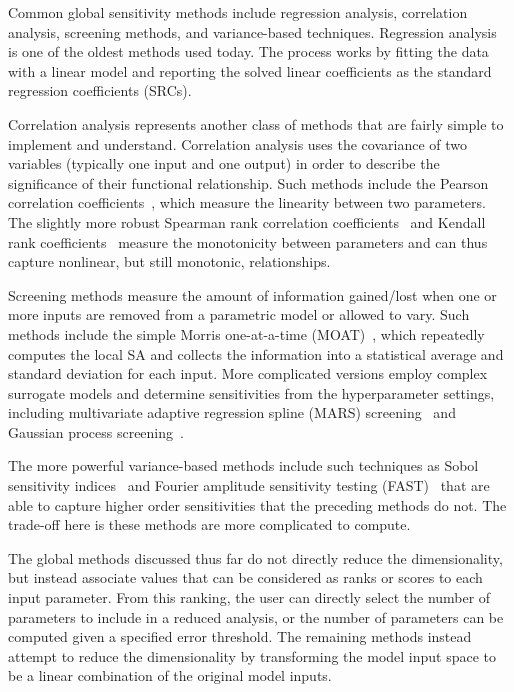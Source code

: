 Common global sensitivity methods include regression analysis, correlation analysis, screening methods, and variance-based techniques.
%
Regression analysis~\cite{Galton1886} is one of the oldest methods used today.
%
The process works by fitting the data with a linear model and reporting the solved linear coefficients as the standard regression coefficients (SRCs).

Correlation analysis represents another class of methods that are fairly simple to implement and understand.
%
Correlation analysis uses the covariance of two variables (typically one input and one output) in order to describe the significance of their functional relationship.
%
Such methods include the Pearson correlation coefficients~\cite{Kirch2008,Pearson1895}, which measure the linearity between two parameters.
%
The slightly more robust Spearman rank correlation coefficients~\cite{Spearman1904a} and Kendall rank coefficients~\cite{KendallGibbons1990} measure the monotonicity between parameters and can thus capture nonlinear, but still monotonic, relationships.

Screening methods measure the amount of information gained/lost when one or more inputs are removed from a parametric model or allowed to vary.
%
Such methods include the simple Morris one-at-a-time (MOAT)~\cite{Morris1991}, which repeatedly computes the local SA and collects the information into a statistical average and standard deviation for each input.
%
More complicated versions employ complex surrogate models and determine sensitivities from the hyperparameter settings, including multivariate adaptive regression spline (MARS) screening~\cite{Friedman1991} and Gaussian process screening~\cite{RasmussenWilliams2006}.

The more powerful variance-based methods include such techniques as Sobol sensitivity indices~\cite{Sobol1993} and Fourier amplitude sensitivity testing (FAST)~\cite{CukierFortuinShuler1973} that are able to capture higher order sensitivities that the preceding methods do not.
%
The trade-off here is these methods are more complicated to compute.

The global methods discussed thus far do not directly reduce the dimensionality, but instead associate values that can be considered as ranks or scores to each input parameter.
%
From this ranking, the user can directly select the number of parameters to include in a reduced analysis, or the number of parameters can be computed given a specified error threshold.
%
The remaining methods instead attempt to reduce the dimensionality by transforming the model input space to be a linear combination of the original model inputs.
%

